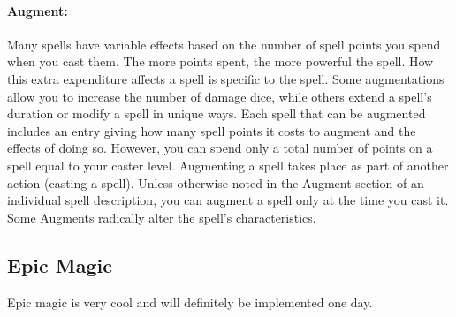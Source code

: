 \paragraph{Augment:} Many spells have variable effects based on the number of spell points you spend when you cast them. The more points spent, the more powerful the spell. How this extra expenditure affects a spell is specific to the spell. Some augmentations allow you to increase the number of damage dice, while others extend a spell's duration or modify a spell in unique ways. Each spell that can be augmented includes an entry giving how many spell points it costs to augment and the effects of doing so. However, you can spend only a total number of points on a spell equal to your caster level.
Augmenting a spell takes place as part of another action (casting a spell). Unless otherwise noted in the Augment section of an individual spell description, you can augment a spell only at the time you cast it. Some Augments radically alter the spell's characteristics.
\subsection{Epic Magic}
Epic magic is very cool and will definitely be implemented one day.
